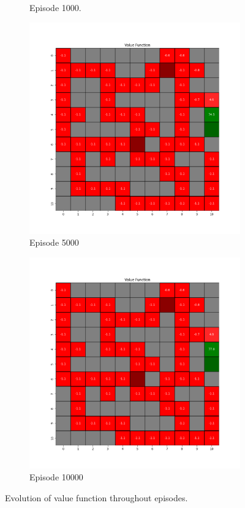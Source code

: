 \documentclass{assignment}
\begin{document}
\begin{figure}[H]
\begin{subfigure}{0.3\textwidth}
    \caption{Episode 1000.}
    \end{subfigure}\hfill
    \begin{subfigure}{0.3\textwidth}
        \includegraphics[width=\textwidth]{figures/value_q/gamma_sweep/value_function_alpha_0.1_gamma_0.1_epsilon_0.2_iteration_5000.png}
    \caption{Episode 5000}
    \end{subfigure}\hfill
    \begin{subfigure}{0.3\textwidth}
        \includegraphics[width=\textwidth]{figures/value_q/gamma_sweep/value_function_alpha_0.1_gamma_0.1_epsilon_0.2_iteration_10000.png}
    \caption{Episode 10000}
    \end{subfigure}
    \caption{Evolution of value function throughout episodes.}
    \label{fig:gamma_0.1_q_learning_value}
\end{figure}
\end{document}
